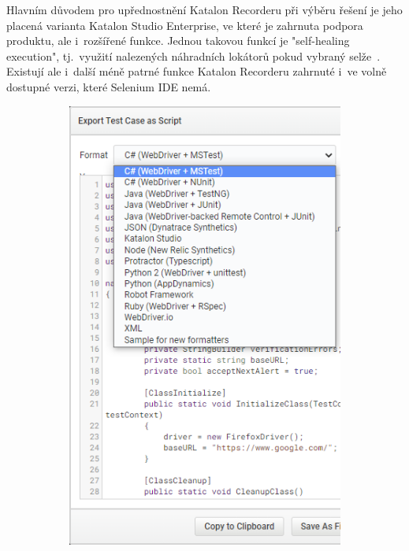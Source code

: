 \documentclass[12pt, a4paper, twoside]{article}
\begin{document}
	Hlavním důvodem pro upřednostnění Katalon Recorderu při výběru řešení je jeho placená varianta Katalon Studio Enterprise, ve které je zahrnuta podpora produktu, ale i~rozšířené funkce. Jednou takovou funkcí je "self-healing execution", tj.~využití nalezených náhradních lokátorů pokud vybraný selže~\cite{katalonPricing}. Existují ale i~další méně patrné funkce Katalon Recorderu zahrnuté i~ve volně dostupné verzi, které Selenium IDE nemá.
	\begin{figure}[H]
		\begin{subfigure}[t]{0.6\textwidth}
			\includegraphics[width=1.0\textwidth]{katalonRecorderExport.png}

\end{subfigure}
\end{figure}
\end{document}
